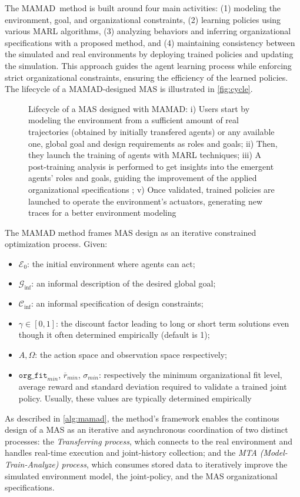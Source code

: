 The MAMAD~\footnotemark[1] method is built around four main activities: (1) modeling the environment, goal, and organizational constraints, (2) learning policies using various MARL algorithms, (3) analyzing behaviors and inferring organizational specifications with a proposed method, and (4) maintaining consistency between the simulated and real environments by deploying trained policies and updating the simulation. This approach guides the agent learning process while enforcing strict organizational constraints, ensuring the efficiency of the learned policies. The lifecycle of a MAMAD-designed MAS is illustrated in \autoref{fig:cycle}.
%
\begin{figure}[h!]
    \centering
    
    \caption{Lifecycle of a MAS designed with MAMAD: i) Users start by modeling the environment from a sufficient amount of real trajectories (obtained by initially transfered agents) or any available one, global goal and design requirements as roles and goals; \quad ii) Then, they launch the training of agents with MARL techniques; \quad iii) A post-training analysis is performed to get insights into the emergent agents' roles and goals, guiding the improvement of the applied organizational specifications ; \quad v) Once validated, trained policies are launched to operate the environment's actuators, generating new traces for a better environment modeling}
    \label{fig:cycle}
\end{figure}
%
The MAMAD method frames MAS design as an iterative constrained optimization process. Given:
\begin{itemize}
    \item $\mathcal{E}_0$: the initial environment where agents can act;
    \item $\mathcal{G}_{\text{inf}}$: an informal description of the desired global goal;
    \item $\mathcal{C}_{\text{inf}}$: an informal specification of design constraints;
    \item $\gamma \in [0,1]$: the discount factor leading to long or short term solutions even though it often determined empirically (default is 1);
    \item $A, \Omega$: the action space and observation space respectively;
    \item $\texttt{org\_fit}_{min}$, $\overline{r}_{min}$, $\sigma_{min}$: respectively the minimum organizational fit level, average reward and standard deviation required to validate a trained joint policy. Usually, these values are typically determined empirically
\end{itemize}
%
\noindent As described in \autoref{alg:mamad}, the method's framework enables the continous design of a MAS as an iterative and asynchronous coordination of two distinct processes: the \textit{Transferring process}, which connects to the real environment and handles real-time execution and joint-history collection; and the \textit{MTA (Model-Train-Analyze) process}, which consumes stored data to iteratively improve the simulated environment model, the joint-policy, and the MAS organizational specifications.

